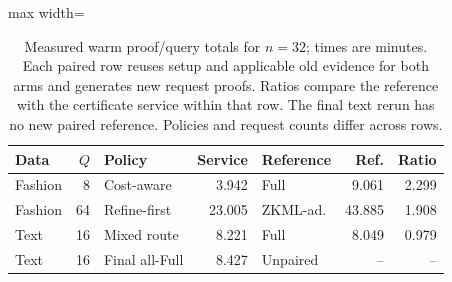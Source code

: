 \begin{table}[tbp]
\centering
\small
\caption{Measured warm proof/query totals for $n=32$; times are minutes. Each paired row reuses setup and applicable old evidence for both arms and generates new request proofs. Ratios compare the reference with the certificate service within that row. The final text rerun has no new paired reference. Policies and request counts differ across rows.}
\label{tab:ccd-warm}
\begin{adjustbox}{max width=\textwidth}
\begin{tabular*}{.98\textwidth}{@{\extracolsep{\fill}}lrlrlrr@{}}
\toprule
Data & $Q$ & Policy & Service & Reference & Ref. & Ratio\\
\midrule
Fashion & 8 & Cost-aware & 3.942 & Full & 9.061 & 2.299\\
Fashion & 64 & Refine-first & 23.005 & ZKML-ad. & 43.885 & 1.908\\
Text & 16 & Mixed route & 8.221 & Full & 8.049 & 0.979\\
Text & 16 & Final all-Full & 8.427 & Unpaired & -- & --\\
\bottomrule
\end{tabular*}
\end{adjustbox}
\end{table}
